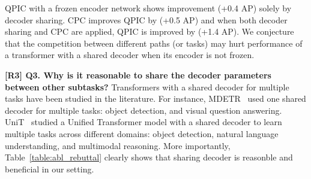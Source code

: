 \documentclass[10pt,twocolumn,letterpaper]{article}
\newcommand{\hjk}[1]{{\color{black}#1}}
\begin{document}
{         


        


        






         
        


         


         




         
 \vspace{-4mm}
QPIC with a frozen encoder network shows improvement (+0.4 AP) solely by decoder sharing. 
CPC improves QPIC by (+0.5 AP) and when both decoder sharing and CPC are applied, QPIC is improved by (+1.4 AP).
We conjecture that the competition between different paths (or tasks) may hurt performance of a transformer with a shared decoder when its encoder is not frozen.}
\newline




\vspace{-4mm}
\hjk{
\noindent\textbf{[R3] Q3. Why is it reasonable to share the decoder parameters between other subtasks?} 
\newline
Transformers with a shared decoder for multiple tasks have been studied in the literature. 
For instance, MDETR~\cite{Kamath_2021_ICCV} used one shared decoder for multiple tasks: object detection, and visual question answering. UniT~\cite{Hu_2021_ICCV} studied a Unified Transformer model with a shared decoder to learn multiple tasks across different domains: object detection, natural language understanding, and multimodal reasoning.
More importantly, Table~\ref{table:abl_rebuttal} clearly shows 
that sharing decoder is reasonble and beneficial in our setting.
}







\vspace{-7pt}
{\small


}
\end{document}

